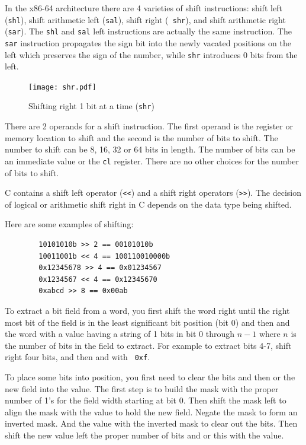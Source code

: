 \documentclass[11pt,b5paper]{book}
\begin{document}
In the x86-64 architecture there are 4 varieties of shift instructions:
shift left ({\tt shl}), shift arithmetic left ({\tt sal}), shift right ({\tt
shr}), and shift arithmetic right ({\tt sar}).
The {\tt shl} and {\tt sal} left instructions are actually the same
instruction.
The {\tt sar} instruction propagates the sign bit into the newly vacated
positions on the left which preserves the sign of the number, while {\tt shr}
introduces 0 bits from the left.

\begin{figure}[h!]
\centering\texttt{[image: shr.pdf]}
\caption{Shifting right 1 bit at a time ({\tt shr})}
\end{figure}


There are 2 operands for a shift instruction.
The first operand is the register or memory location to shift and the second
is the number of bits to shift.
The number to shift can be 8, 16, 32 or 64 bits in length.
The number of bits can be an immediate value or the {\tt cl} register.
There are no other choices for the number of bits to shift.

C contains a shift left operator ({\tt <<}) and a shift right operators
({\tt >>}).
The decision of logical or arithmetic shift right in C depends on the data
type being shifted.

Here are some examples of shifting:
\begin{verbatim}
        10101010b >> 2 == 00101010b
        10011001b << 4 == 100110010000b
        0x12345678 >> 4 == 0x01234567
        0x1234567 << 4 == 0x12345670
        0xabcd >> 8 == 0x00ab
\end{verbatim}

To extract a bit field from a word, you first shift the word right until the  
right most bit of the field is in the least significant bit position (bit 0)
and then and the word with a value having a string of 1 bits in bit 0 through 
$n-1$ where $n$ is the number of bits in the field to extract.
For example to extract bits 4-7, shift right four bits, and then and with {\tt
0xf}.

To place some bits into position, you first need to clear the bits and then
or the new field into the value.
The first step is to build the mask with the proper number of 1's for the
field width starting at bit 0.
Then shift the mask left to align the mask with the value to hold the new
field.
Negate the mask to form an inverted mask.
And the value with the inverted mask to clear out the bits.
Then shift the new value left the proper number of bits and or this with the
value.
\end{document}
